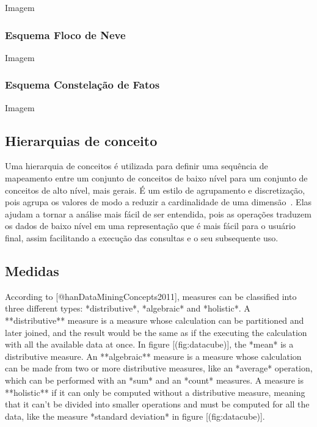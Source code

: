 {\color{red} Imagem}

\subsubsection{Esquema Floco de Neve}
\label{ch:fun:cube:dimm:snow}

{\color{red} Imagem}

\subsubsection{Esquema Constelação de Fatos}
\label{ch:fun:cube:dimm:constellation}

{\color{red} Imagem}

\subsection{Hierarquias de conceito}
\label{ch:fun:cube:concept}

Uma hierarquia de conceitos é utilizada para definir uma sequência de mapeamento entre um conjunto de conceitos de baixo nível para um conjunto de conceitos de alto nível, mais gerais.
É um estilo de agrupamento e discretização, pois agrupa os valores de modo a reduzir a cardinalidade de uma dimensão~\cite{hanDataMiningConcepts2011}.
Elas ajudam a tornar a análise mais fácil de ser entendida, pois as operações traduzem os dados de baixo nível em uma representação que é mais fácil para o usuário final, assim facilitando a execução das consultas e o seu subsequente uso.

\subsection{Medidas}

According to [@hanDataMiningConcepts2011], measures can be classified into three different types: *distributive*, *algebraic* and *holistic*. A **distributive** measure is a measure whose calculation can be partitioned and later joined, and the result would be the same as if the executing the calculation with all the available data at once. In figure [\@ref(fig:datacube)], the *mean* is a distributive measure.
An **algebraic** measure is a measure whose calculation can be made from two or more distributive measures, like an *average* operation, which can be performed with an *sum* and an *count* measures.
A measure is **holistic** if it can only be computed without a distributive measure, meaning that it can't be divided into smaller operations and must be computed for all the data, like the measure *standard deviation* in figure [\@ref(fig:datacube)].


